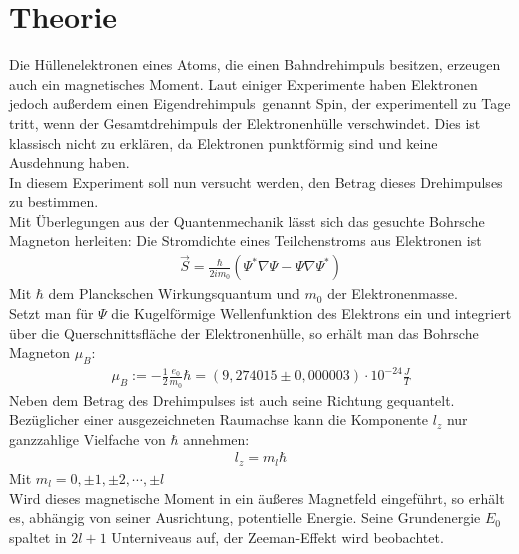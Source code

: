 

\section{Theorie}
\setcounter{page}{1}
Die Hüllenelektronen eines Atoms, die einen Bahndrehimpuls besitzen, erzeugen auch
ein magnetisches Moment. Laut einiger Experimente haben Elektronen jedoch außerdem einen \glqq Eigendrehimpuls\grqq \, genannt \glqq Spin\grqq, der experimentell zu Tage tritt, wenn der Gesamtdrehimpuls der Elektronenhülle verschwindet. Dies ist klassisch nicht zu erklären, da Elektronen punktförmig sind und keine Ausdehnung haben.\\
In diesem Experiment soll nun versucht werden, den Betrag dieses Drehimpulses zu bestimmen.\\

Mit Überlegungen aus der Quantenmechanik lässt sich das gesuchte Bohrsche Magneton herleiten: Die Stromdichte eines Teilchenstroms aus Elektronen ist 
\begin{align}
\vec{S} = \frac{\hbar}{2im_0} (\Psi^* \nabla \Psi - \Psi \nabla \Psi^*)
\end{align}
Mit $\hbar$ dem Planckschen Wirkungsquantum und $m_0$ der Elektronenmasse.\\

Setzt man für $\Psi$ die Kugelförmige Wellenfunktion des Elektrons ein und integriert über die Querschnittsfläche der Elektronenhülle, so erhält man das Bohrsche Magneton $\mu_B$:
\begin{align}
\mu_B := -\frac{1}{2}\frac{e_0}{m_0}\hbar= (9,274015 \pm 0,000003)\cdot10^{-24} \frac{J}{T}
\end{align}
Neben dem Betrag des Drehimpulses ist auch seine Richtung gequantelt. Bezüglicher einer ausgezeichneten Raumachse kann die Komponente $l_z$ nur ganzzahlige Vielfache von $\hbar$ annehmen:
\begin{align}
l_z=m_l\hbar
\end{align}
Mit $m_l = 0, \pm 1, \pm 2,\cdots , \pm l$\\

Wird dieses magnetische Moment in ein äußeres Magnetfeld eingeführt, so erhält es, abhängig von seiner Ausrichtung, potentielle Energie. Seine Grundenergie $E_0$ spaltet in $2l+1$ Unterniveaus auf, der Zeeman-Effekt wird beobachtet.\\

